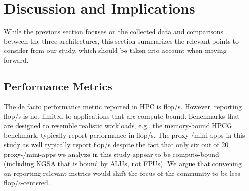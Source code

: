 \section{Discussion and Implications}\label{sec:discuss}
%
%

While the previous section focuses on the collected data and comparisons between
the three architectures, this section summarizes the relevant points to consider
from our study, which should be taken into account when moving forward.

\subsection{Performance Metrics}
The de facto performance metric reported in HPC is \unit[]{flop/s}. However, reporting \unit[]{flop/s} is not limited to applications that are compute-bound. Benchmarks that are designed to resemble realistic workloads, e.g., the
memory-bound HPCG benchmark, typically report performance in \unit[]{flop/s}. The proxy-/mini-apps in this study
as well typically report \unit[]{flop/s} despite the fact that only six out of 20 proxy-/mini-apps we analyze in
this study appear to be compute-bound (including NGSA that is bound by ALUs, not FPUs). We
argue that convening on reporting relevant metrics would shift the focus of the community to be less \unit[]{flop/s}-centered.

